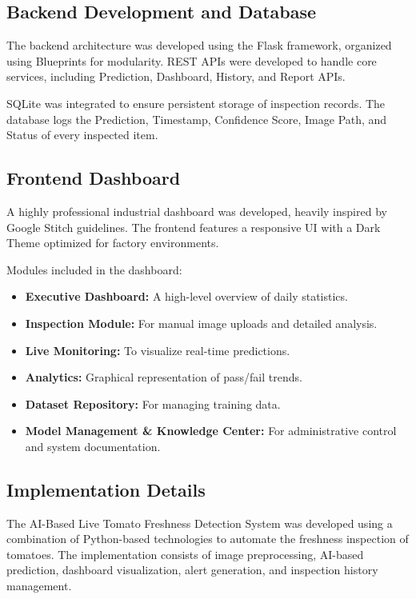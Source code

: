 \subsection{Backend Development and Database}

The backend architecture was developed using the \cite{flask} Flask framework, organized using Blueprints for modularity. REST APIs were developed to handle core services, including Prediction, Dashboard, History, and Report APIs.

SQLite was integrated to ensure persistent storage of inspection records. The database logs the Prediction, Timestamp, Confidence Score, Image Path, and Status of every inspected item.

\subsection{Frontend Dashboard}

A highly professional industrial dashboard was developed, heavily inspired by Google Stitch guidelines. The frontend features a responsive UI with a Dark Theme optimized for factory environments.

Modules included in the dashboard:
\begin{itemize}[leftmargin=1.5cm]
    \item \textbf{Executive Dashboard:} A high-level overview of daily statistics.
    \item \textbf{Inspection Module:} For manual image uploads and detailed analysis.
    \item \textbf{Live Monitoring:} To visualize real-time predictions.
    \item \textbf{Analytics:} Graphical representation of pass/fail trends.
    \item \textbf{Dataset Repository:} For managing training data.
    \item \textbf{Model Management \& Knowledge Center:} For administrative control and system documentation.
\end{itemize}

\subsection{Implementation Details}

The AI-Based Live Tomato Freshness Detection System was developed using a combination of Python-based technologies to automate the freshness inspection of tomatoes. The implementation consists of image preprocessing, AI-based prediction, dashboard visualization, alert generation, and inspection history management.

